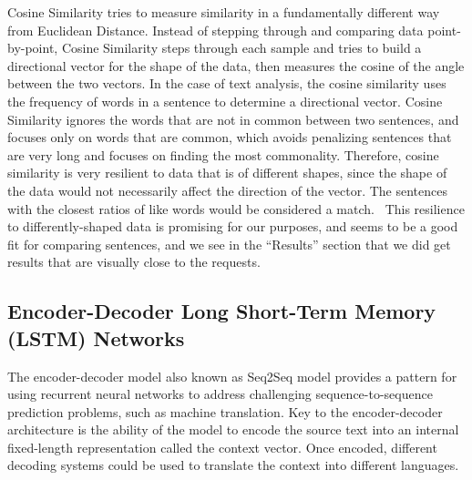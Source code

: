 \documentclass[runningheads]{llncs}
\begin{document}
Cosine Similarity tries to measure similarity in a fundamentally different way from Euclidean Distance. Instead of stepping through and comparing data point-by-point, Cosine Similarity steps through each sample and tries to build a directional vector for the shape of the data, then measures the cosine of the angle between the two vectors. In the case of text analysis, the cosine similarity uses the frequency of words in a sentence to determine a directional vector. Cosine Similarity ignores the words that are not in common between two sentences, and focuses only on words that are common, which avoids penalizing sentences that are very long and focuses on finding the most commonality. Therefore, cosine similarity is very resilient to data that is of different shapes, since the shape of the data would not necessarily affect the direction of the vector. The sentences with the closest ratios of like words would be considered a match.~\cite{ref_book1} This resilience to differently-shaped data is promising for our purposes, and seems to be a good fit for comparing sentences, and we see in the ``Results'' section that we did get results that are visually close to the requests.

	\subsection{Encoder-Decoder Long Short-Term Memory (LSTM) Networks}
	The encoder-decoder model also known as Seq2Seq model provides a pattern for using recurrent neural networks to address challenging sequence-to-sequence prediction problems, such as machine translation.
	Key to the encoder-decoder architecture is the ability of the model to encode the source text into an internal fixed-length representation called the context vector. Once encoded, different decoding systems could be used to translate the context into different languages.

	\begin{minipage}{\linewidth}
		\begin{center}
			\hspace*{-.25in}
  			 \noindent{}
			\label{fig:Sequence to Sequence Model}
		\end{center}
	\end{minipage}
	\afterpage{\clearpage}
	
\end{document}
